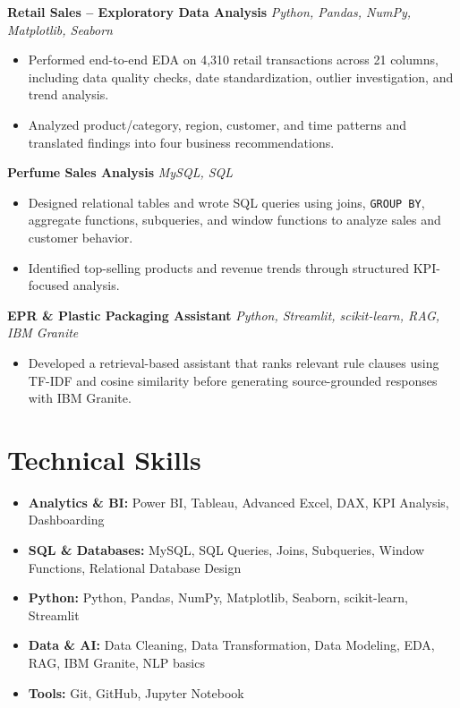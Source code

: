 \documentclass[10pt,a4paper]{article}
\begin{document}
\vspace{4pt}
\textbf{Retail Sales -- Exploratory Data Analysis} \textbar{} \textit{Python, Pandas, NumPy, Matplotlib, Seaborn}
\begin{itemize}
  \item Performed end-to-end EDA on 4,310 retail transactions across 21 columns, including data quality checks, date standardization, outlier investigation, and trend analysis.
  \item Analyzed product/category, region, customer, and time patterns and translated findings into four business recommendations.
\end{itemize}

\vspace{4pt}
\textbf{Perfume Sales Analysis} \textbar{} \textit{MySQL, SQL}
\begin{itemize}
  \item Designed relational tables and wrote SQL queries using joins, \texttt{GROUP BY}, aggregate functions, subqueries, and window functions to analyze sales and customer behavior.
  \item Identified top-selling products and revenue trends through structured KPI-focused analysis.
\end{itemize}

\vspace{4pt}
\textbf{EPR \& Plastic Packaging Assistant} \textbar{} \textit{Python, Streamlit, scikit-learn, RAG, IBM Granite}
\begin{itemize}
  \item Developed a retrieval-based assistant that ranks relevant rule clauses using TF-IDF and cosine similarity before generating source-grounded responses with IBM Granite.
\end{itemize}

\section{Technical Skills}
\begin{itemize}[leftmargin=0pt, label={}, itemsep=2pt]
  \item \textbf{Analytics \& BI:} Power BI, Tableau, Advanced Excel, DAX, KPI Analysis, Dashboarding
  \item \textbf{SQL \& Databases:} MySQL, SQL Queries, Joins, Subqueries, Window Functions, Relational Database Design
  \item \textbf{Python:} Python, Pandas, NumPy, Matplotlib, Seaborn, scikit-learn, Streamlit
  \item \textbf{Data \& AI:} Data Cleaning, Data Transformation, Data Modeling, EDA, RAG, IBM Granite, NLP basics
  \item \textbf{Tools:} Git, GitHub, Jupyter Notebook
\end{itemize}
\end{document}
